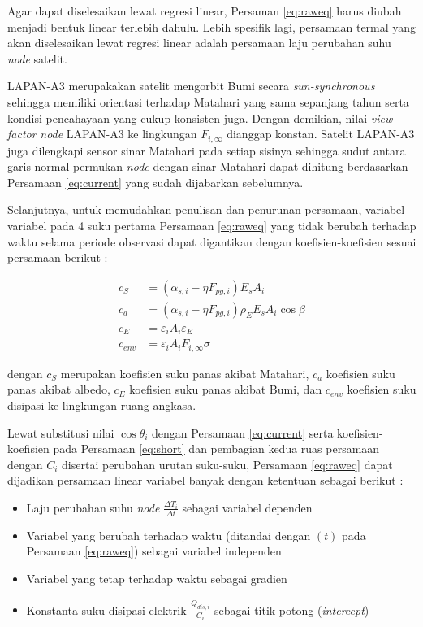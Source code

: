 Agar dapat diselesaikan lewat regresi linear, Persaman \ref{eq:raweq} harus
diubah menjadi bentuk linear terlebih dahulu. Lebih spesifik lagi, persamaan
termal yang akan diselesaikan lewat regresi linear adalah persamaan laju
perubahan suhu \textit{node} satelit.

LAPAN-A3 merupakakan satelit mengorbit Bumi secara \textit{sun-synchronous}
sehingga memiliki orientasi terhadap Matahari yang sama sepanjang tahun serta
kondisi pencahayaan yang cukup konsisten juga. Dengan demikian, nilai
\textit{view factor} \textit{node} LAPAN-A3 ke lingkungan $F_{i,\infty}$
dianggap konstan. Satelit LAPAN-A3 juga dilengkapi sensor sinar Matahari pada
setiap sisinya sehingga sudut antara garis normal permukan \textit{node} dengan
sinar Matahari dapat dihitung berdasarkan Persamaan \ref{eq:current} yang sudah
dijabarkan sebelumnya.

Selanjutnya, untuk memudahkan penulisan dan penurunan persamaan,
variabel-variabel pada 4 suku pertama Persamaan \ref{eq:raweq} yang tidak
berubah terhadap waktu selama periode observasi dapat digantikan dengan
koefisien-koefisien sesuai persamaan berikut :

\begin{equation}
\label{eq:short}
\begin{split}
	c_{S} &= \left(\alpha_{s,i} - \eta F_{pg,i}\right) E_s A_i \\
	c_{a} &= \left(\alpha_{s,i} - \eta F_{pg,i}\right)\rho_{E} E_s A_i \cos{\beta} \\
	c_{E} &= \varepsilon_i A_i \varepsilon_E \\
	c_{env} &= \varepsilon_i A_i F_{i,\infty} \sigma
\end{split}
\end{equation}

dengan $c_{S}$ merupakan koefisien suku panas akibat Matahari, $c_{a}$
koefisien suku panas akibat albedo, $c_{E}$ koefisien suku panas akibat Bumi,
dan $c_{env}$ koefisien suku disipasi ke lingkungan ruang angkasa.

Lewat substitusi nilai $\cos{\theta_i}$ dengan Persamaan \ref{eq:current} serta
koefisien-koefisien pada Persamaan \ref{eq:short} dan pembagian kedua ruas
persamaan dengan $C_i$ disertai perubahan urutan suku-suku,
Persamaan \ref{eq:raweq} dapat dijadikan persamaan linear variabel banyak
dengan ketentuan sebagai berikut :

\begin{itemize}
	\item Laju perubahan suhu \textit{node} $\frac{\Delta T_i}{\Delta t}$ sebagai variabel dependen
	\item Variabel yang berubah terhadap waktu (ditandai dengan $(t)$ pada Persamaan \ref{eq:raweq}) sebagai variabel independen
	\item Variabel yang tetap terhadap waktu sebagai gradien
	\item Konstanta suku disipasi elektrik $\frac{\dot{Q}_{dis,i}}{C_i}$ sebagai titik potong (\textit{intercept})
\end{itemize}

